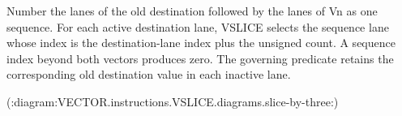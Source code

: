 Number the lanes of the old destination followed by the lanes of Vn as one
sequence.  For each active destination lane, VSLICE selects the sequence lane
whose index is the destination-lane index plus the unsigned count.  A sequence
index beyond both vectors produces zero.  The governing predicate retains the
corresponding old destination value in each inactive lane.

(:diagram:VECTOR.instructions.VSLICE.diagrams.slice-by-three:)

